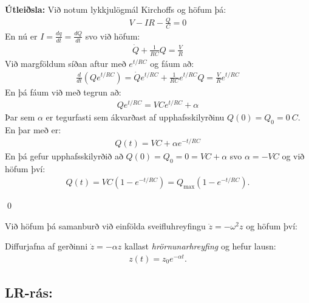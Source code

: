 \ifdefined \wholebook \else\documentclass[oneside]{book}\usepackage{EdlBook}\graphicspath{{figures/}}
\begin{document}
\textbf{Útleiðsla:} Við notum lykkjulögmál Kirchoffs og höfum þá:
\begin{align*}
    V - IR - \frac{Q}{C} = 0
\end{align*}
En nú er $I = \frac{dq}{dt} = \frac{dQ}{dt}$ svo við höfum:
\begin{align*}
    \dot{Q} + \frac{1}{RC}Q = \frac{V}{R}
\end{align*}
Við margföldum síðan aftur með $e^{t/RC}$ og fáum að:
\begin{align*}
    \frac{d}{dt}\left( Qe^{t/RC} \right) = \dot{Q}e^{t/RC} + \frac{1}{RC}e^{t/RC}Q = \frac{V}{R}e^{t/RC}
\end{align*}
En þá fáum við með tegrun að:
\begin{align*}
    Qe^{t/RC} = VCe^{t/RC} + \alpha
\end{align*}
Þar sem $\alpha$ er tegurfasti sem ákvarðast af upphafsskilyrðinu $Q(0) = Q_0 = \SI{0}{C}$. En þar með er:
\begin{align*}
    Q(t) = VC + \alpha e^{-t/RC}
\end{align*}
En þá gefur upphafsskilyrðið að $Q(0) = Q_0 = 0 = VC + \alpha$ svo $\alpha = - VC$ og við höfum því:
\begin{align*}
    Q(t) = VC\left( 1 - e^{-t/RC} \right) = Q_{\text{max}}\left(1- e^{-t/RC}\right).
\end{align*}

\qed

Við höfum þá samanburð við einfölda sveifluhreyfingu $\ddot{z} = -\omega^2 z$ og höfum því:

\begin{tcolorbox}
\begin{definition}
Diffurjafna af gerðinni $\dot{z} = -\alpha z$ kallast \emph{hrörnunarhreyfing} og hefur lausn:
\begin{align*}
    z(t) = z_0e^{-\alpha t}.
\end{align*}
\end{definition}
\end{tcolorbox}

\newpage

\subsection{LR-rás:}
\end{document}

